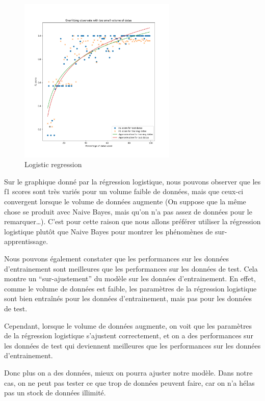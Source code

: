 \documentclass[
]{article}
\begin{document}
\begin{figure}
\centering
\includegraphics[width=0.67\textwidth,height=\textheight]{../res/overfitting_reg.png}
\caption{Logistic regression}
\end{figure}

Sur le graphique donné par la régression logistique, nous pouvons
observer que les f1 scores sont très variés pour un volume faible de
données, mais que ceux-ci convergent lorsque le volume de données
augmente (On suppose que la même chose se produit avec Naive Bayes, mais
qu'on n'a pas assez de données pour le remarquer\ldots). C'est pour
cette raison que nous allons préférer utiliser la régression logistique
plutôt que Naive Bayes pour montrer les phénomènes de sur-apprentissage.

Nous pouvons également constater que les performances sur les données
d'entrainement sont meilleures que les performances sur les données de
test. Cela montre un ``sur-ajustement'' du modèle sur les données
d'entrainement. En effet, comme le volume de données est faible, les
paramètres de la régression logistique sont bien entraînés pour les
données d'entrainement, mais pas pour les données de test.

Cependant, lorsque le volume de données augmente, on voit que les
paramètres de la régression logistique s'ajustent correctement, et on a
des performances sur les données de test qui deviennent meilleures que
les performances sur les données d'entrainement.

Donc plus on a des données, mieux on pourra ajuster notre modèle. Dans
notre cas, on ne peut pas tester ce que trop de données peuvent faire,
car on n'a hélas pas un stock de données illimité.
\end{document}
